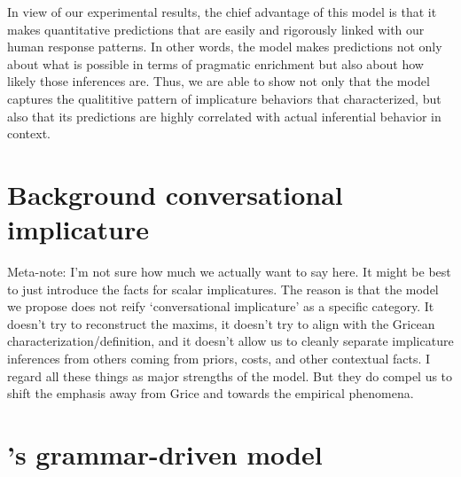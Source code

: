 \documentclass{article}
\begin{document}
In view of our experimental results, the chief advantage of this model
is that it makes quantitative predictions that are easily and
rigorously linked with our human response patterns.  In other words,
the model makes predictions not only about what is possible in terms
of pragmatic enrichment but also about how likely those inferences
are. Thus, we are able to show not only that the model captures the
qualititive pattern of implicature behaviors that
\citeauthor{Chemla:Spector:2011} characterized, but also that its
predictions are highly correlated with actual inferential behavior in
context.



\section{Background  conversational implicature}\label{sec:ci}

\begin{examples}
\item Meta-note: I'm not sure how much we actually want to say here.
  It might be best to just introduce the facts for scalar
  implicatures. The reason is that the model we propose does not reify
  `conversational implicature' as a specific category. It doesn't try
  to reconstruct the maxims, it doesn't try to align with the Gricean
  characterization/definition, and it doesn't allow us to cleanly
  separate implicature inferences from others coming from priors,
  costs, and other contextual facts. I regard all these things as
  major strengths of the model. But they do compel us to shift the
  emphasis away from Grice and towards the empirical phenomena.
\end{examples}



\section{\CFS's grammar-driven model}\label{sec:grammar}
\end{document}
